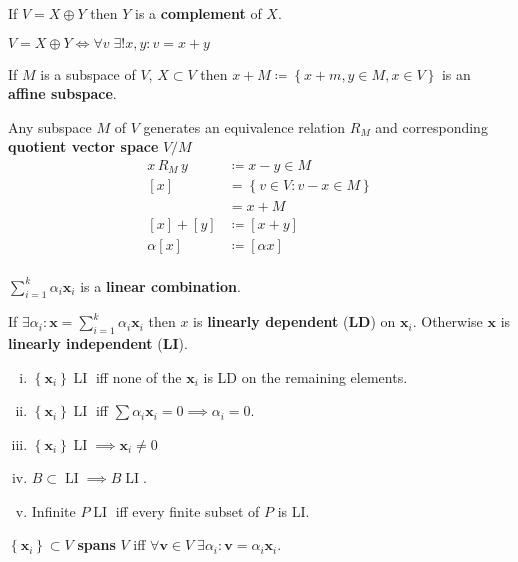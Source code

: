 \documentclass[letterpaper,11pt]{amsart}
\newcommand{\keyphrase}[1]{\textbf{#1}}
\DeclareMathOperator{\LI}{LI}
\begin{document}
If $V=X\oplus{}Y$ then $Y$ is a \keyphrase{complement} of $X$.

$V=X\oplus{}Y \iff \forall v \; \exists ! x, y : v=x+y$

If $M$ is a subspace of $V$, $X\subset{V}$ then
$x+M\coloneqq \left\{ x+m, y\in{M}, x\in{}V \right\}$ is an
\keyphrase{affine subspace}.

Any subspace $M$ of $V$ generates an equivalence relation $R_{M}$ and
corresponding \keyphrase{quotient vector space} $V/M$
\begin{align*}
    x\,R_{M}\,y &\coloneqq x-y \in M \\
    \left[ x \right] &= \left\{ v \in V : v-x \in M \right\}  \\
        &= x + M \\
    \left[ x \right] + \left[ y \right] &\coloneqq \left[ x+y \right] \\
    \alpha \left[ x \right] &\coloneqq \left[ \alpha x \right] \\
\end{align*}

$\sum_{i=1}^{k} \alpha_{i} \mathbf{x}_{i}$ is a
\keyphrase{linear combination}.

If
$\exists \alpha_{i} : \mathbf{x} = \sum_{i=1}^{k} \alpha_{i} \mathbf{x}_{i}$
then $x$ is \keyphrase{linearly dependent} (\keyphrase{LD}) on $\mathbf{x}_{i}$.
Otherwise $\mathbf{x}$ is \keyphrase{linearly independent} (\keyphrase{LI}).
\begin{enumerate}[(i)]
    \item $\left\{ \mathbf{x}_{i} \right\} \LI$ iff none of the
        $\mathbf{x}_{i}$ is LD on the remaining elements.
    \item $\left\{ \mathbf{x}_{i} \right\} \LI$ iff
        $\sum \alpha_{i} \mathbf{x}_{i} = 0 \implies \alpha_{i}=0$.
    \item $\left\{ \mathbf{x}_{i} \right\} \LI \implies \mathbf{x}_{i}\neq{}0$
    \item $B\subset\LI \implies B \LI$.
    \item Infinite $P \LI$ iff every finite subset of $P$ is LI.
\end{enumerate}

$\left\{ \mathbf{x}_{i} \right\}\subset{}V$
\keyphrase{spans} $V$ iff $\forall{}\mathbf{v}\in{}V\;
\exists{}\alpha_{i}:\mathbf{v}=\alpha_{i}\mathbf{x}_{i}$.
\end{document}

